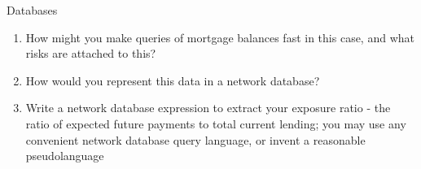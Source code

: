 \documentclass{tripos}
\begin{document}
\begin{question}[MockIA,year=2025,paper=1,question=6,author=nobody]{Databases}
\begin{enumerate}
  \item How might you make queries of mortgage balances fast in this case, and what risks are attached to this? 
  \item How would you represent this data in a network database? 
  \item Write a network database expression to extract your exposure ratio - the ratio of expected future payments to total current lending; you may use any convenient network database query language, or invent a reasonable pseudolanguage 
  \end{enumerate}
\end{question}
\eject
\end{document}
